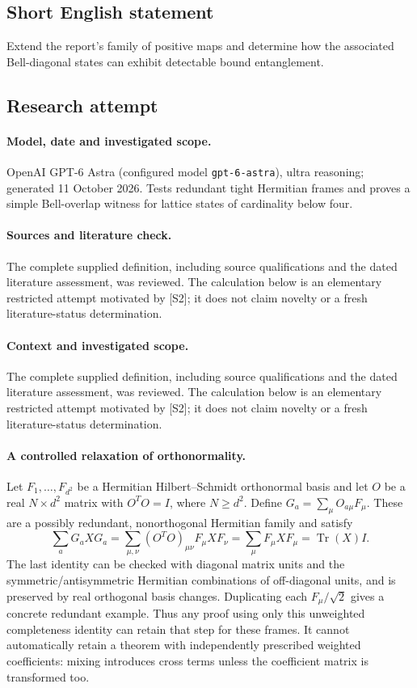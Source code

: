 \documentclass[11pt]{article}
\begin{document}
\subsection{Short English statement}
Extend the report's family of positive maps and determine how the associated Bell-diagonal states can exhibit detectable bound entanglement.
\subsection{Research attempt}
\paragraph{Model, date and investigated scope.}
OpenAI GPT-6 Astra (configured model \texttt{gpt-6-astra}), ultra reasoning; generated 11 October 2026. Tests redundant tight Hermitian frames and proves a simple Bell-overlap witness for lattice states of cardinality below four.

\paragraph{Sources and literature check.}
The complete supplied definition, including source qualifications and the dated literature assessment, was reviewed. The calculation below is an elementary restricted attempt motivated by [S2]; it does not claim novelty or a fresh literature-status determination.

\paragraph{Context and investigated scope.} The complete supplied definition, including source qualifications and the dated literature assessment, was reviewed. The calculation below is an elementary restricted attempt motivated by [S2]; it does not claim novelty or a fresh literature-status determination.

\paragraph{A controlled relaxation of orthonormality.} Let $F_1,\ldots,F_{d^2}$ be a Hermitian Hilbert--Schmidt orthonormal basis and let $O$ be a real $N\times d^2$ matrix with $O^TO=I$, where $N\geq d^2$. Define $G_a=\sum_\mu O_{a\mu}F_\mu$. These are a possibly redundant, nonorthogonal Hermitian family and satisfy
\[
 \sum_aG_aXG_a=\sum_{\mu,\nu}(O^TO)_{\mu\nu}F_\mu XF_\nu
 =\sum_\mu F_\mu XF_\mu=\operatorname{Tr}(X)I.
\]
The last identity can be checked with diagonal matrix units and the symmetric/antisymmetric Hermitian combinations of off-diagonal units, and is preserved by real orthogonal basis changes. Duplicating each $F_\mu/\sqrt2$ gives a concrete redundant example. Thus any proof using only this unweighted completeness identity can retain that step for these frames. It cannot automatically retain a theorem with independently prescribed weighted coefficients: mixing introduces cross terms unless the coefficient matrix is transformed too.
\end{document}
